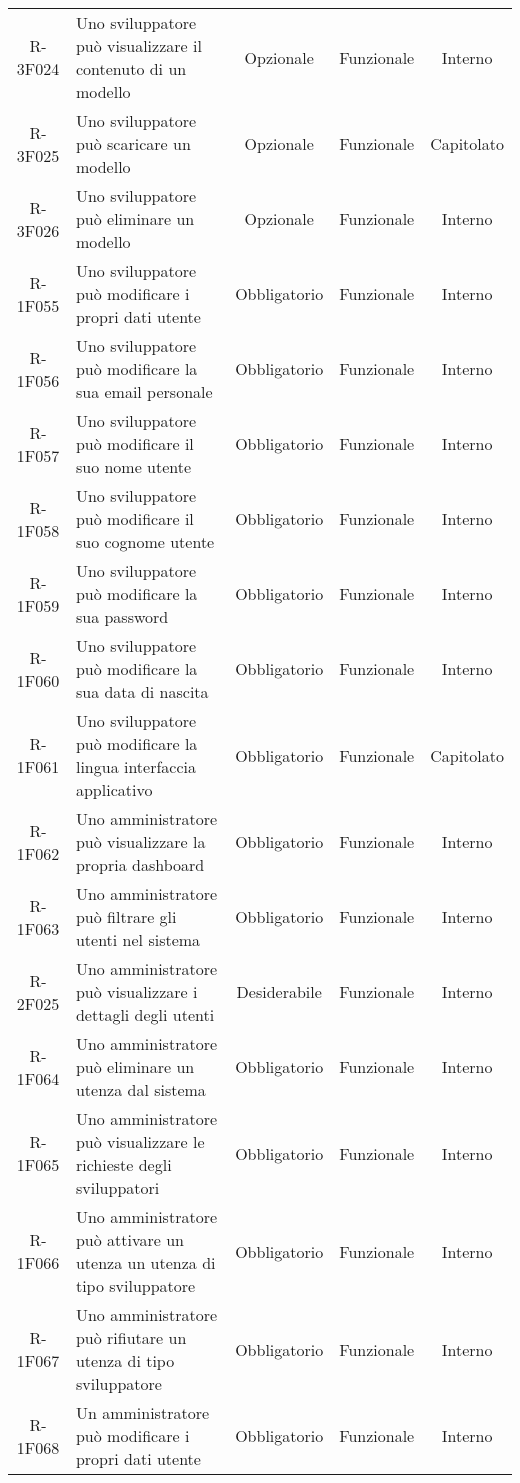\begin{tabularx}{\textwidth}{cXccc}
			R-3F024 & Uno sviluppatore può visualizzare il contenuto di un modello & Opzionale & Funzionale & Interno \\
			R-3F025 & Uno sviluppatore può scaricare un modello & Opzionale & Funzionale & Capitolato \\
			R-3F026 & Uno sviluppatore può eliminare un modello & Opzionale & Funzionale & Interno \\
			R-1F055 & Uno sviluppatore può modificare i propri dati utente & Obbligatorio & Funzionale & Interno \\
			R-1F056 & Uno sviluppatore può modificare la sua email personale & Obbligatorio & Funzionale & Interno \\
			R-1F057 & Uno sviluppatore può modificare il suo nome utente & Obbligatorio & Funzionale & Interno \\
			R-1F058 & Uno sviluppatore può modificare il suo cognome utente & Obbligatorio & Funzionale & Interno \\
			R-1F059 & Uno sviluppatore può modificare la sua password & Obbligatorio & Funzionale & Interno \\
			R-1F060 & Uno sviluppatore può modificare la sua data di nascita & Obbligatorio & Funzionale & Interno \\
			R-1F061 & Uno sviluppatore può modificare la lingua interfaccia applicativo & Obbligatorio & Funzionale & Capitolato \\
			R-1F062 & Uno amministratore può visualizzare la propria dashboard & Obbligatorio & Funzionale & Interno \\
			R-1F063 & Uno amministratore può filtrare gli utenti nel sistema & Obbligatorio & Funzionale & Interno \\
			R-2F025 & Uno amministratore può visualizzare i dettagli degli utenti & Desiderabile & Funzionale & Interno \\
			R-1F064 & Uno amministratore può eliminare un utenza dal sistema & Obbligatorio & Funzionale & Interno \\
			R-1F065 & Uno amministratore può visualizzare le richieste degli sviluppatori & Obbligatorio & Funzionale & Interno \\
			R-1F066 & Uno amministratore può attivare un utenza un utenza di tipo sviluppatore & Obbligatorio & Funzionale & Interno \\
			R-1F067 & Uno amministratore può rifiutare un utenza di tipo sviluppatore & Obbligatorio & Funzionale & Interno \\
			R-1F068 & Un amministratore può modificare i propri dati utente & Obbligatorio & Funzionale & Interno \\

\end{tabularx}
